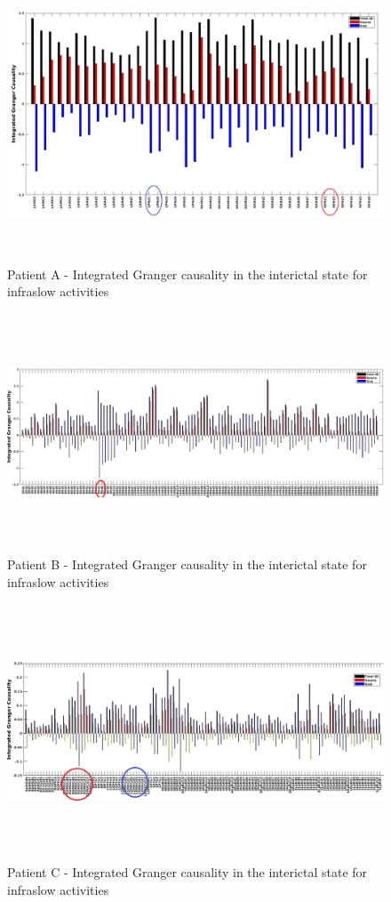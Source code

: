 \begin{figure}
\centerline{
	\includegraphics[height =3.5in]{Plots/Patient_A_interictal_low.jpg}
	}

	\caption{Patient A - Integrated Granger causality in the interictal state for infraslow activities}

	\label{fig:apdx_patient_a_interictal_low}
\end{figure}

\begin{figure}
\centerline{
	\includegraphics[height =2.8in]{Plots/Patient_B_interictal_low.jpg}
	}

	\caption{Patient B - Integrated Granger causality in the interictal state for infraslow activities}

	\label{fig:apdx_patient_b_interictal_low}
\end{figure}


\begin{figure}
\centerline{
	\includegraphics[height =3in]{Plots/Patient_C_interictal_low.jpg}
	}

	\caption{Patient C - Integrated Granger causality in the interictal state for infraslow activities}

	\label{fig:apdx_patient_c_interictal_low}
\end{figure}